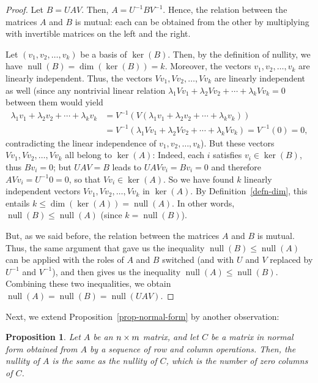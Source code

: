 \documentclass[reqno]{amsart}
\newtheorem{proposition}[theorem]{Proposition}
\theoremstyle{definition}
\newcommand{\nullity}{\operatorname{null}}
\begin{document}
\begin{proof}
 Let $B = UAV$. Then, $A = U^{-1}BV^{-1}$. Hence,
 the relation between the matrices $A$ and $B$ is
 mutual: each can be obtained from the other by
 multiplying with invertible matrices on the left
 and the right.

 Let $(v_1, v_2, \ldots, v_k)$ be a basis of
 $\ker(B)$. Then, by the definition of nullity,
 we have $\nullity(B) = \dim(\ker(B)) = k$. Moreover, the vectors
 $v_1, v_2, \ldots, v_k$ are linearly independent.
 Thus, the vectors $V v_1, V v_2, \ldots, V v_k$
 are linearly independent as well (since any
 nontrivial linear relation
 $\lambda_1 V v_1 + \lambda_2 V v_2 + \cdots + \lambda_k V v_k = 0$
 between them would yield
 \begin{align*}
 \lambda_1 v_1 + \lambda_2 v_2 + \cdots + \lambda_k v_k
 &= V^{-1}\left(V\left(\lambda_1 v_1 + \lambda_2 v_2 + \cdots + \lambda_k v_k\right)\right)
 \\
 &= V^{-1}\left(\lambda_1 V v_1 + \lambda_2 V v_2 + \cdots + \lambda_k V v_k\right)
 = V^{-1}\left(0\right) = 0,
 \end{align*}
 contradicting the linear independence of
 $v_1, v_2, \ldots, v_k$). But these vectors
 $V v_1, V v_2, \ldots, V v_k$ all belong to
 $\ker(A)$: Indeed, each $i$ satisfies $v_i \in \ker(B)$,
 thus $B v_i = 0$; but $UAV = B$ leads to
 $UAV v_i = B v_i = 0$ and therefore
 $AV v_i = U^{-1} 0 = 0$, so that $V v_i \in \ker(A)$.
 So we have found $k$ linearly independent
 vectors $V v_1, V v_2, \ldots, V v_k$ in $\ker(A)$.
 By Definition~\ref{defn-dim}, this entails
 $k \leq \dim(\ker(A)) = \nullity(A)$.
 In other words, $\nullity(B) \leq \nullity(A)$ (since $k = \nullity(B)$).
 
 But, as we said before, the relation between the matrices $A$ and $B$ is
 mutual. Thus, the same argument that gave us the inequality
 $\nullity(B) \leq \nullity(A)$
 can be applied with the roles of $A$ and $B$ switched (and with $U$ and
 $V$ replaced by $U^{-1}$ and $V^{-1}$), and then gives us the inequality
 $\nullity(A) \leq \nullity(B)$. Combining these two inequalities, we obtain
 $\nullity(A) = \nullity(B) = \nullity(UAV)$.
\end{proof}

Next, we extend Proposition~\ref{prop-normal-form} by another
observation:

\begin{proposition}\label{prop-normal-form-c}
 Let $A$ be an $n\times m$ matrix, and let $C$ be a matrix in normal
 form obtained from $A$ by a sequence of row and column operations.
 Then, the nullity of $A$ is the same as the nullity of $C$, which
 is the number of zero columns of $C$.
\end{proposition}
\end{document}
